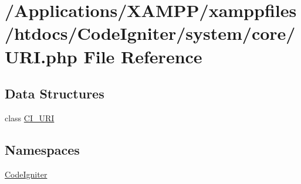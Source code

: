 \hypertarget{_u_r_i_8php}{}\section{/\+Applications/\+X\+A\+M\+P\+P/xamppfiles/htdocs/\+Code\+Igniter/system/core/\+U\+RI.php File Reference}
\label{_u_r_i_8php}
\subsection*{Data Structures}
\begin{DoxyCompactItemize}
\item 
class \mbox{\hyperlink{class_c_i___u_r_i}{C\+I\+\_\+\+U\+RI}}
\end{DoxyCompactItemize}
\subsection*{Namespaces}
\begin{DoxyCompactItemize}
\item 
 \mbox{\hyperlink{namespace_code_igniter}{Code\+Igniter}}
\end{DoxyCompactItemize}
